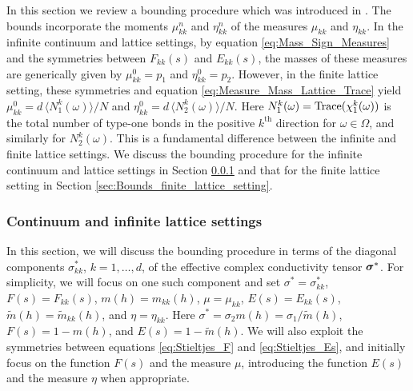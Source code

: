 \documentclass{cmslatex}
\newcommand\bsig{\mbox{\boldmath${\sigma}$}}
\begin{document}
In this section we review a bounding procedure which was 
introduced in \cite{Golden:CMP-473}. The bounds incorporate
the moments $\mu_{kk}^n$ and $\eta_{kk}^n$ of the measures $\mu_{kk}$ and
$\eta_{kk}$.  In the infinite continuum and lattice settings, by equation
\eqref{eq:Mass_Sign_Measures} and the symmetries between $F_{kk}(s)$
and $E_{kk}(s)$, the masses of these measures are generically given by
$\mu_{kk}^0=p_1$ and $\eta_{kk}^0=p_2$. However, in the finite lattice
setting, these symmetries and equation
\eqref{eq:Measure_Mass_Lattice_Trace} yield $\mu_{kk}^0=d\,\langle N_1^k(\omega)\rangle/N$
and $\eta_{kk}^0=d\,\langle N_2^k(\omega)\rangle/N$. Here $N_1^k(\omega)={\rm Trace}(\chi_1^k(\omega))$
is the total number of type-one bonds in the positive $k^{\text{th}}$ 
direction for $\omega\in\Omega$, and similarly for $N_2^k(\omega)$. This is a
fundamental difference between the infinite and finite lattice
settings. We discuss the bounding procedure for the infinite continuum
and lattice settings in Section \ref{sec:Bounds_infinite_setting} and
that for the finite lattice setting in Section
\ref{sec:Bounds_finite_lattice_setting}.   


\subsubsection{Continuum and infinite lattice settings}
\label{sec:Bounds_infinite_setting}
%
In this section, we will discuss the bounding procedure in terms of
the diagonal components $\sigma^*_{kk}$, $k=1,\ldots,d$, of the effective
complex conductivity tensor $\bsig^*$. For
simplicity, we will focus on one such component and set
$\sigma^*=\sigma_{kk}^*$, $F(s)=F_{kk}(s)$, $m(h)=m_{kk}(h)$, $\mu=\mu_{kk}$,
$E(s)=E_{kk}(s)$, $\tilde{m}(h)=\tilde{m}_{kk}(h)$, and
$\eta=\eta_{kk}$. Here $\sigma^*=\sigma_2m(h)=\sigma_1/\tilde{m}(h)$, $F(s)=1-m(h)$, and
$E(s)=1-\tilde{m}(h)$. We will also exploit the symmetries between
equations \eqref{eq:Stieltjes_F} and \eqref{eq:Stieltjes_Es}, and
initially focus on the function $F(s)$ and the measure $\mu$,
introducing the function $E(s)$ and the measure $\eta$ when
appropriate.
\end{document}
